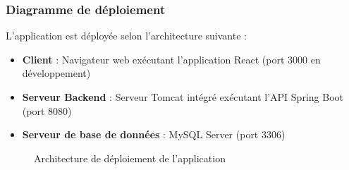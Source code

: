 \documentclass[12pt,a4paper]{report}
\begin{document}
\subsubsection{Diagramme de déploiement}

L'application est déployée selon l'architecture suivante :

\begin{itemize}[leftmargin=1cm]
    \item \textbf{Client} : Navigateur web exécutant l'application React (port 3000 en développement)
    
    \item \textbf{Serveur Backend} : Serveur Tomcat intégré exécutant l'API Spring Boot (port 8080)
    
    \item \textbf{Serveur de base de données} : MySQL Server (port 3306)
\end{itemize}

\begin{figure}[H]
\centering
{}
\caption{Architecture de déploiement de l'application}
\end{figure}
\end{document}
